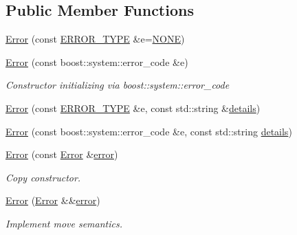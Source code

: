 \subsection*{Public Member Functions}
\begin{DoxyCompactItemize}
\item 
\hyperlink{classshaan97_1_1sync_1_1_error_a8eaff7b62f525d1d33b68438d8ca3b7e}{Error} (const \hyperlink{namespaceshaan97_1_1sync_a69f4d5572314be52626f6a1c8ecc8db9}{E\+R\+R\+O\+R\+\_\+\+T\+Y\+PE} \&e=\hyperlink{namespaceshaan97_1_1sync_a69f4d5572314be52626f6a1c8ecc8db9a52c4a0d7144160a041261253a2a82894}{N\+O\+NE})
\item 
\hyperlink{classshaan97_1_1sync_1_1_error_a23316cc22cfb5377a0d1173ca44066be}{Error} (const boost\+::system\+::error\+\_\+code \&e)
\begin{DoxyCompactList}\small\item\em Constructor initializing via {\ttfamily boost\+::system\+::error\+\_\+code} \end{DoxyCompactList}\item 
\hyperlink{classshaan97_1_1sync_1_1_error_ad98956db1a62bc2269b27e4ba252a598}{Error} (const \hyperlink{namespaceshaan97_1_1sync_a69f4d5572314be52626f6a1c8ecc8db9}{E\+R\+R\+O\+R\+\_\+\+T\+Y\+PE} \&e, const std\+::string \&\hyperlink{classshaan97_1_1sync_1_1_error_a92edb57631c4d7a2f0177f3440111b23}{details})
\item 
\hyperlink{classshaan97_1_1sync_1_1_error_aa8237d2411892451c587189721b7e0c3}{Error} (const boost\+::system\+::error\+\_\+code \&e, const std\+::string \hyperlink{classshaan97_1_1sync_1_1_error_a92edb57631c4d7a2f0177f3440111b23}{details})
\item 
\hyperlink{classshaan97_1_1sync_1_1_error_aef2207b7ee0f2c8105bed5cffda76c68}{Error} (const \hyperlink{classshaan97_1_1sync_1_1_error}{Error} \&\hyperlink{classshaan97_1_1sync_1_1_error_ab84e9af061261009996c1297c5cad5bd}{error})
\begin{DoxyCompactList}\small\item\em Copy constructor. \end{DoxyCompactList}\item 
\hyperlink{classshaan97_1_1sync_1_1_error_a637d6482658ecea21d66ac90e970100b}{Error} (\hyperlink{classshaan97_1_1sync_1_1_error}{Error} \&\&\hyperlink{classshaan97_1_1sync_1_1_error_ab84e9af061261009996c1297c5cad5bd}{error})
\begin{DoxyCompactList}\small\item\em Implement move semantics. \end{DoxyCompactList}\item 

\end{DoxyCompactItemize}
